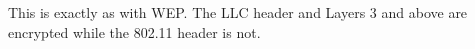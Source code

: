 This is exactly as with WEP. The LLC header and Layers 3 and above are encrypted while the 802.11 header is not.
